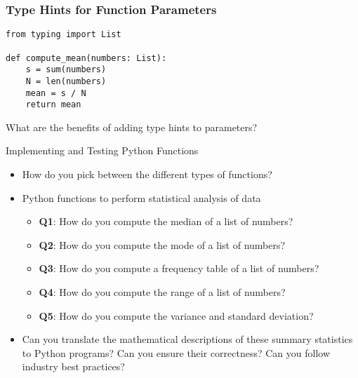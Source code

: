 \documentclass[14pt,aspectratio=169]{beamer}
\begin{document}
%
\begin{frame}[fragile]
  \frametitle{Type Hints for Function Parameters}
  \hspace*{.1in}
  \begin{minipage}{6in}
    \vspace*{.1in}
    \begin{verbatim}
from typing import List

def compute_mean(numbers: List):
    s = sum(numbers)
    N = len(numbers)
    mean = s / N
    return mean
    \end{verbatim}
  \end{minipage}
  \vspace*{.05in}
  \begin{center}
    \normalsize \noindent What are the benefits of adding type hints to
    parameters? \\
  \end{center}

\end{frame}

%
\begin{frame}{Implementing and Testing Python Functions}
  \begin{itemize}
    \item How do you pick between the different types of functions?
      \vspace*{-.35in}
    \item Python functions to perform statistical analysis of data
      \begin{itemize}
        \item {\bf Q1}: How do you compute the median of a list of numbers?
        \item {\bf Q2}: How do you compute the mode of a list of numbers?
        \item {\bf Q3}: How do you compute a frequency table of a list of
          numbers?
        \item {\bf Q4}: How do you compute the range of a list of numbers?
        \item {\bf Q5}: How do you compute the variance and standard deviation?
      \end{itemize}
      \vspace*{-.2in}
    \item Can you translate the mathematical descriptions of these summary
      statistics to Python programs? Can you ensure their correctness? Can you
      follow industry best practices?
  \end{itemize}
\end{frame}
\end{document}
